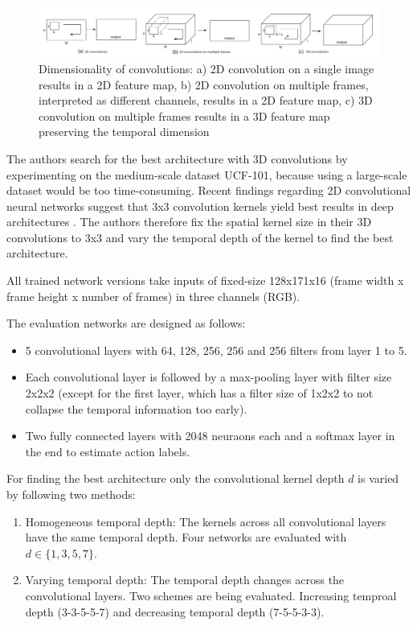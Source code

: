 \begin{figure}[H]
    \centering
    \includegraphics[width=\textwidth]{img_deep/c3d_2dconv3dconv}
\caption{Dimensionality of convolutions: a) 2D convolution on a single image results in a 2D feature map, b) 2D convolution on multiple frames, interpreted as different channels, results in a 2D feature map, c) 3D convolution on multiple frames results in a 3D feature map preserving the temporal dimension \cite{karpathy_large-scale_2014}}
    \label{fig:c3d_2dconv3dconv}
\end{figure}

The authors search for the best architecture with 3D convolutions by experimenting on the medium-scale dataset UCF-101, because using a large-scale dataset would be too time-consuming.
Recent findings regarding 2D convolutional neural networks suggest that 3x3 convolution kernels yield best results in deep architectures \cite{simonyan_very_2014}. The authors therefore fix the spatial kernel size in their 3D convolutions to 3x3 and vary the temporal depth of the kernel to find the best architecture.

All trained network versions take inputs of fixed-size 128x171x16 (frame width x frame height x number of frames) in three channels (RGB).

The evaluation networks are designed as follows:
\begin{itemize}
    \item 5 convolutional layers with 64, 128, 256, 256 and 256 filters from layer 1 to 5.
    \item Each convolutional layer is followed by a max-pooling layer with filter size 2x2x2 (except for the first layer, which has a filter size of 1x2x2 to not collapse the temporal information too early).
    \item Two fully connected layers with 2048 neuraons each and a softmax layer in the end to estimate action labels.
\end{itemize}

For finding the best architecture only the convolutional kernel depth $d$ is varied by following two methods:
\begin{enumerate}
    \item Homogeneous temporal depth: The kernels across all convolutional layers have the same temporal depth. Four networks are evaluated with $d \in \{1, 3, 5, 7\}$.
    \item Varying temporal depth: The temporal depth changes across the convolutional layers. Two schemes are being evaluated. Increasing temproal depth (3-3-5-5-7) and decreasing temporal depth (7-5-5-3-3).
\end{enumerate}

